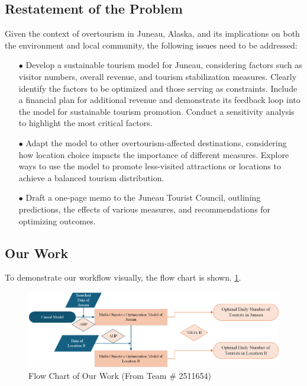 \documentclass[12pt]{article}  %
\begin{document}
 \subsection{Restatement of the Problem}
 Given the context of overtourism in Juneau, Alaska, and its implications on both the environment and local community, the following issues need to be addressed:
 \begin{itemize}
    \item[$\bullet$]Develop a sustainable tourism model for Juneau, considering factors such as visitor numbers, overall revenue, and tourism stabilization measures. Clearly identify the factors to be optimized and those serving as constraints. Include a financial plan for additional revenue and demonstrate its feedback loop into the model for sustainable tourism promotion. Conduct a sensitivity analysis to highlight the most critical factors.
    \item[$\bullet$]Adapt the model to other overtourism-affected destinations, considering how location choice impacts the importance of different measures. Explore ways to use the model to promote less-visited attractions or locations to achieve a balanced tourism distribution.
    \item[$\bullet$]Draft a one-page memo to the Juneau Tourist Council, outlining predictions, the effects of various measures, and recommendations for optimizing outcomes.
 \end{itemize}
\subsection{Our Work}
 
To demonstrate our workflow visually, the flow chart is shown. 
\ref{fig1}.
  

 \begin{figure}[h]  %
 
 \centering  %
 \includegraphics[width=.9\textwidth]{chart2.png} %
 \caption{Flow Chart of Our Work (From Team \# 2511654)} %
 \label{fig1}%
 \end{figure}
 
\end{document}
